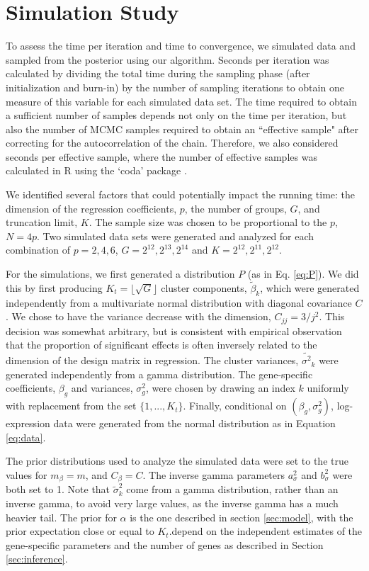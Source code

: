 {\section{Simulation Study}
\label{sec:timing}
To assess the time per iteration and time to convergence, we simulated data and sampled from the posterior using our algorithm. Seconds per iteration was calculated by dividing the total time during the sampling phase (after initialization and burn-in) by the number of sampling iterations to obtain one measure of this variable for each simulated data set. The time required to obtain a sufficient number of samples depends not only on the time per iteration, but also the number of MCMC samples required to obtain an ``effective sample" after correcting for the autocorrelation of the chain. Therefore, we also considered seconds per effective sample, where the number of effective samples was calculated in R using the `coda' package \cite{plummer}.

We identified several factors that could potentially impact the running time: the dimension of the regression coefficients, $p$, the number of groups, $G$, and truncation limit, $K$. The sample size was chosen to be proportional to the $p$, $N=4p$. Two simulated data sets were generated and analyzed for each combination of $p=2,4,6$, $G=2^12,2^13,2^14$ and $K=2^12,2^11,2^12$.

For the simulations, we first generated a distribution $P$ (as in Eq. \ref{eq:P}). We did this by first producing $K_t=\lfloor \sqrt{G}\rfloor$ cluster components, $\tilde{\beta}_k$, which were generated independently from a multivariate normal distribution with diagonal covariance $C$. We chose to have the variance decrease with the dimension, $C_{jj} = 3/j^2$. This decision was somewhat arbitrary, but is consistent with empirical observation that the proportion of significant effects is often inversely related to the dimension of the design matrix in regression. The cluster variances, $\tilde{\sigma^2}_k$ were generated independently from a gamma distribution. The gene-specific coefficients, $\beta_g$ and variances, $\sigma^2_g$, were chosen by drawing an index $k$ uniformly with replacement from the set $\{1,...,K_t\}$. Finally, conditional on $(\beta_g,\sigma^2_g)$, log-expression data were generated from the normal distribution as in Equation \ref{eq:data}.

The prior distributions used to analyze the simulated data were set to the true values for $m_\beta = m$, and $C_\beta = C$. The inverse gamma parameters $a_\sigma^2$ and $b_\sigma^2$ were both set to 1. Note that $\tilde{\sigma}^2_k$ come from a gamma distribution, rather than an inverse gamma, to avoid very large values, as the inverse gamma has a much heavier tail. The prior for $\alpha$ is the one described in section \ref{sec:model}, with the prior expectation close or equal to $K_t$.depend on the independent estimates of the gene-specific parameters and the number of genes as described in Section \ref{sec:inference}.

}
